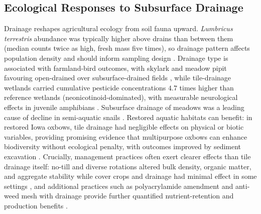 \documentclass[11pt]{article}
\begin{document}
\subsection{Ecological Responses to Subsurface Drainage}

Drainage reshapes agricultural ecology from soil fauna upward. \textit{Lumbricus
terrestris} abundance was typically higher above drains than between them (median
counts twice as high, fresh mass five times), so drainage pattern affects
population density and should inform sampling design
\parencite{Nuutinen2001,Nuutinen2011}. Drainage type is associated with
farmland-bird outcomes, with skylark and meadow pipit favouring open-drained over
subsurface-drained fields \parencite{Marja2013}, while tile-drainage wetlands
carried cumulative pesticide concentrations $4.7$ times higher than reference
wetlands (neonicotinoid-dominated), with measurable neurological effects in
juvenile amphibians \parencite{Campbell2023}. Subsurface drainage of meadows was
a leading cause of decline in semi-aquatic snails \parencite{Dreyfuss2018}.
Restored aquatic habitats can benefit: in restored Iowa oxbows, tile drainage had
negligible effects on physical or biotic variables, providing promising evidence
that multipurpose oxbows can enhance biodiversity without ecological penalty, with
outcomes improved by sediment excavation
\parencite{Leberg2024,Winikoff2020,Harris2018}. Crucially, management practices
often exert clearer effects than tile drainage itself: no-till and diverse
rotations altered bulk density, organic matter, and aggregate stability while
cover crops and drainage had minimal effect in some settings
\parencite{Saha2024,Hermawan1996,Sherbine2023}, and additional practices such as
polyacrylamide amendment and anti-weed mesh with drainage provide further
quantified nutrient-retention and production benefits
\parencite{Jiang2010,GiménezValero2024,GiménezValero2025}.

\printbibliography
\end{document}
